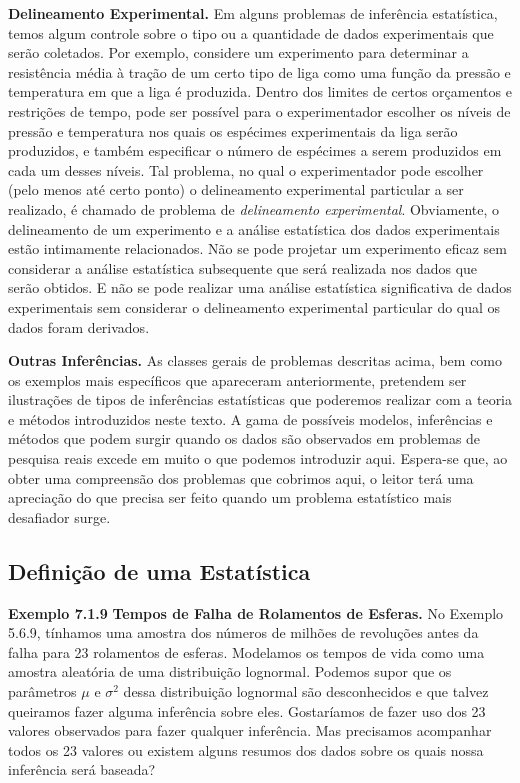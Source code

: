 \vspace{0.5cm}
\noindent\textbf{Delineamento Experimental.} Em alguns problemas de inferência estatística, temos algum controle sobre o tipo ou a quantidade de dados experimentais que serão coletados. Por exemplo, considere um experimento para determinar a resistência média à tração de um certo tipo de liga como uma função da pressão e temperatura em que a liga é produzida. Dentro dos limites de certos orçamentos e restrições de tempo, pode ser possível para o experimentador escolher os níveis de pressão e temperatura nos quais os espécimes experimentais da liga serão produzidos, e também especificar o número de espécimes a serem produzidos em cada um desses níveis.
Tal problema, no qual o experimentador pode escolher (pelo menos até certo ponto) o delineamento experimental particular a ser realizado, é chamado de problema de \textit{delineamento experimental}. Obviamente, o delineamento de um experimento e a análise estatística dos dados experimentais estão intimamente relacionados. Não se pode projetar um experimento eficaz sem considerar a análise estatística subsequente que será realizada nos dados que serão obtidos. E não se pode realizar uma análise estatística significativa de dados experimentais sem considerar o delineamento experimental particular do qual os dados foram derivados.

\vspace{0.5cm}
\noindent\textbf{Outras Inferências.} As classes gerais de problemas descritas acima, bem como os exemplos mais específicos que apareceram anteriormente, pretendem ser ilustrações de tipos de inferências estatísticas que poderemos realizar com a teoria e métodos introduzidos neste texto. A gama de possíveis modelos, inferências e métodos que podem surgir quando os dados são observados em problemas de pesquisa reais excede em muito o que podemos introduzir aqui. Espera-se que, ao obter uma compreensão dos problemas que cobrimos aqui, o leitor terá uma apreciação do que precisa ser feito quando um problema estatístico mais desafiador surge.

\subsection*{Definição de uma Estatística}
\noindent\textbf{Exemplo 7.1.9} \quad \textbf{Tempos de Falha de Rolamentos de Esferas.} No Exemplo 5.6.9, tínhamos uma amostra dos números de milhões de revoluções antes da falha para 23 rolamentos de esferas. Modelamos os tempos de vida como uma amostra aleatória de uma distribuição lognormal. Podemos supor que os parâmetros $\mu$ e $\sigma^2$ dessa distribuição lognormal são desconhecidos e que talvez queiramos fazer alguma inferência sobre eles. Gostaríamos de fazer uso dos 23 valores observados para fazer qualquer inferência. Mas precisamos acompanhar todos os 23 valores ou existem alguns resumos dos dados sobre os quais nossa inferência será baseada?

